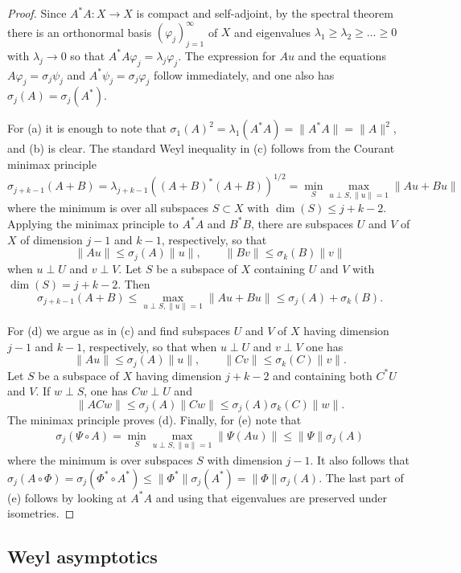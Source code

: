 \documentclass[12pt,twoside]{amsart}
\numberwithin{equation}{section}
\renewcommand{\leq}{\leqslant}
\renewcommand{\geq}{\geqslant}
\newcommand{\norm}[1]{\lVert #1 \rVert}         %
\begin{document}
\begin{proof}
Since $A^* A: X \to X$ is compact and self-adjoint, by the spectral theorem there is an orthonormal basis $(\varphi_j)_{j=1}^{\infty}$ of $X$ and eigenvalues $\lambda_1 \geq \lambda_2 \geq \ldots \geq 0$ with $\lambda_j \to 0$ so that $A^* A \varphi_j = \lambda_j \varphi_j$. The expression for $Au$ and the equations $A \varphi_j = \sigma_j \psi_j$ and $A^* \psi_j = \sigma_j \varphi_j$ follow immediately, and one also has $\sigma_j(A) = \sigma_j(A^*)$.

For (a) it is enough to note that $\sigma_1(A)^2 = \lambda_1(A^* A) = \norm{A^* A} = \norm{A}^2$, and (b) is clear. The standard Weyl inequality in (c) follows from the Courant minimax principle 
\[
\sigma_{j+k-1}(A+B) = \lambda_{j+k-1}((A+B)^*(A+B))^{1/2} = \min_S \max_{u \perp S, \norm{u} = 1} \norm{Au + Bu}
\]
where the minimum is over all subspaces $S \subset X$ with $\dim(S) \leq j+k-2$. Applying the minimax principle to $A^* A$ and $B^* B$, there are subspaces $U$ and $V$ of $X$ of dimension $j-1$ and $k-1$, respectively, so that 
\[
\norm{Au} \leq \sigma_j(A) \norm{u}, \qquad \norm{Bv} \leq \sigma_k(B) \norm{v}
\]
when $u \perp U$ and $v \perp V$. Let $S$ be a subspace of $X$ containing $U$ and $V$ with $\dim(S) = j+k-2$. Then 
\[
\sigma_{j+k-1}(A+B) \leq \max_{u \perp S, \norm{u} = 1} \norm{Au + Bu} \leq \sigma_j(A) + \sigma_k(B).
\]

For (d) we argue as in (c) and find subspaces $U$ and $V$ of $X$ having dimension $j-1$ and $k-1$, respectively, so that when $u \perp U$ and $v \perp V$ one has 
\[
\norm{Au} \leq \sigma_j(A) \norm{u}, \qquad \norm{Cv} \leq \sigma_k(C) \norm{v}.
\]
Let $S$ be a subspace of $X$ having dimension $j+k-2$ and containing both $C^* U$ and $V$. If $w \perp S$, one has $Cw \perp U$ and 
\[
\norm{ACw} \leq \sigma_j(A) \norm{Cw} \leq \sigma_j(A) \sigma_k(C) \norm{w}.
\]
The minimax principle proves (d). Finally, for (e) note that 
\begin{align*}
\sigma_j(\Psi \circ A) = \min_S \max_{u \perp S, \norm{u} = 1} \norm{\Psi(Au)} \leq \norm{\Psi} \sigma_j(A)
\end{align*}
where the minimum is over subspaces $S$ with dimension $j-1$. It also follows that $\sigma_j(A \circ \Phi) = \sigma_j(\Phi^* \circ A^*) \leq \norm{\Phi^*} \sigma_j(A^*) = \norm{\Phi} \sigma_j(A)$. The last part of (e) follows by looking at $A^* A$ and using that eigenvalues are preserved under isometries.
\end{proof}


\subsection{Weyl asymptotics}
\end{document}
